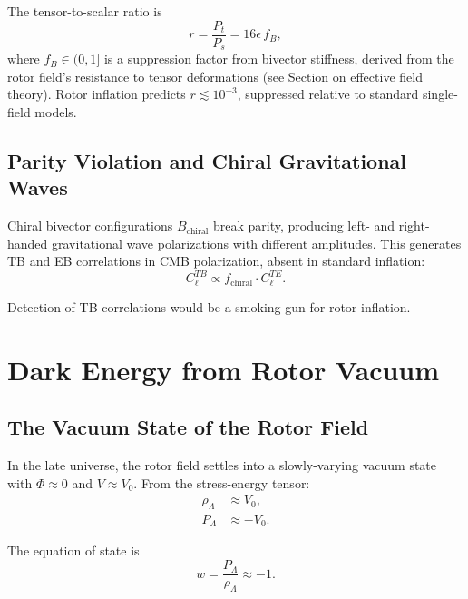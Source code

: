 \documentclass[11pt,a4paper]{article}
\numberwithin{equation}{section}
\theoremstyle{plain}
\theoremstyle{definition}
\theoremstyle{remark}
\begin{document}
The tensor-to-scalar ratio is
\begin{equation}
r = \frac{P_t}{P_s} = 16\epsilon\, f_B,
\label{eq:tensor-ratio}
\end{equation}
where $f_B \in (0,1]$ is a suppression factor from bivector stiffness, derived from the rotor field's resistance to tensor deformations (see Section on effective field theory). Rotor inflation predicts $r \lesssim 10^{-3}$, suppressed relative to standard single-field models.

\subsection{Parity Violation and Chiral Gravitational Waves}

Chiral bivector configurations $B_{\mathrm{chiral}}$ break parity, producing left- and right-handed gravitational wave polarizations with different amplitudes. This generates TB and EB correlations in CMB polarization, absent in standard inflation:
\begin{equation}
C_\ell^{TB} \propto f_{\mathrm{chiral}} \cdot C_\ell^{TE}.
\end{equation}

Detection of TB correlations would be a smoking gun for rotor inflation.

\section{Dark Energy from Rotor Vacuum}
\label{sec:dark-energy}

\subsection{The Vacuum State of the Rotor Field}

In the late universe, the rotor field settles into a slowly-varying vacuum state with $\dot{\Phi} \approx 0$ and $V \approx V_0$. From the stress-energy tensor:
\begin{align}
\rho_{\Lambda} &\approx V_0,\\
P_{\Lambda} &\approx -V_0.
\end{align}

The equation of state is
\begin{equation}
w = \frac{P_{\Lambda}}{\rho_{\Lambda}} \approx -1.
\label{eq:de-eos}
\end{equation}
\end{document}
